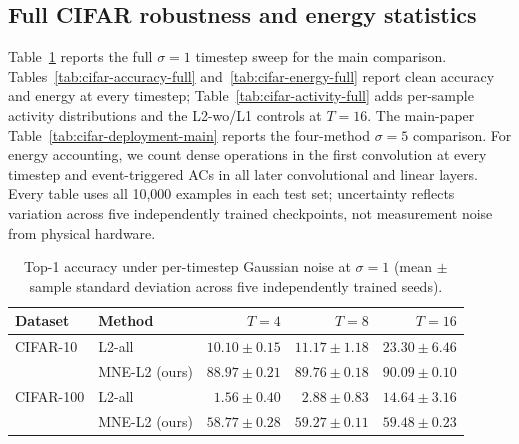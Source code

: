 \documentclass{article}
\begin{document}
\subsection{Full CIFAR robustness and energy statistics}
\label{app:cifar-tables}

Table~\ref{tab:cifar-sigma-one} reports the full $\sigma=1$ timestep sweep for the main comparison. Tables~\ref{tab:cifar-accuracy-full} and~\ref{tab:cifar-energy-full} report clean accuracy and energy at every timestep; Table~\ref{tab:cifar-activity-full} adds per-sample activity distributions and the L2-wo/L1 controls at $T=16$. The main-paper Table~\ref{tab:cifar-deployment-main} reports the four-method $\sigma=5$ comparison. For energy accounting, we count dense operations in the first convolution at every timestep and event-triggered ACs in all later convolutional and linear layers. Every table uses all 10,000 examples in each test set; uncertainty reflects variation across five independently trained checkpoints, not measurement noise from physical hardware.

\begin{table}[t]
\caption{Top-1 accuracy under per-timestep Gaussian noise at $\sigma=1$ (mean $\pm$ sample standard deviation across five independently trained seeds).}
\label{tab:cifar-sigma-one}
\centering
\small
\begin{tabular}{llrrr}
\toprule
Dataset & Method & $T=4$ & $T=8$ & $T=16$ \\
\midrule
CIFAR-10  & L2-all & $10.10\pm0.15$ & $11.17\pm1.18$ & $23.30\pm6.46$ \\
          & MNE-L2 (ours) & $88.97\pm0.21$ & $89.76\pm0.18$ & $90.09\pm0.10$ \\
\midrule
CIFAR-100 & L2-all & $1.56\pm0.40$ & $2.88\pm0.83$ & $14.64\pm3.16$ \\
          & MNE-L2 (ours) & $58.77\pm0.28$ & $59.27\pm0.11$ & $59.48\pm0.23$ \\
\bottomrule
\end{tabular}
\end{table}
\end{document}
